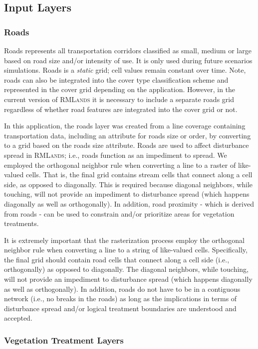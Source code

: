 \subsection{Input Layers}

\subsubsection{Roads} 
Roads represents all transportation corridors classified as small, medium or large based on road size and/or intensity of use. It is only used during future scenarios simulations. Roads is a \emph{static} grid; cell values remain constant over time. Note, roads can also be integrated into the cover type classification scheme and represented in the cover grid depending on the application. However, in the current version of \textsc{RMLands} it is necessary to include a separate roads grid regardless of whether road features are integrated into the cover grid or not.

In this application, the roads layer was created from a line coverage containing transportation data, including an attribute for roads size or order, by converting to a grid based on the roads size attribute. Roads are used to affect disturbance spread in \textsc{RMLands}; i.e., roads function as an impediment to spread. We employed the orthogonal neighbor rule when converting a line to a raster of like-valued cells. That is, the final grid contains stream cells that connect along a cell side, as opposed to diagonally. This is required because diagonal neighbors, while touching, will not provide an impediment to disturbance spread (which happens diagonally as well as orthogonally). In addition, road proximity - which is derived from roads - can be used to constrain and/or prioritize areas for vegetation treatments. 

It is extremely important that the rasterization process employ the orthogonal neighbor rule when converting a line to a string of like-valued cells. Specifically, the final grid should contain road cells that connect along a cell side (i.e., orthogonally) as opposed to diagonally. The diagonal neighbors, while touching, will not provide an impediment to disturbance spread (which happens diagonally as well as orthogonally). In addition, roads do not have to be in a contiguous network (i.e., no breaks in the roads) as long as the implications in terms of disturbance spread and/or logical treatment boundaries are understood and accepted. 


\subsubsection{Vegetation Treatment Layers}

